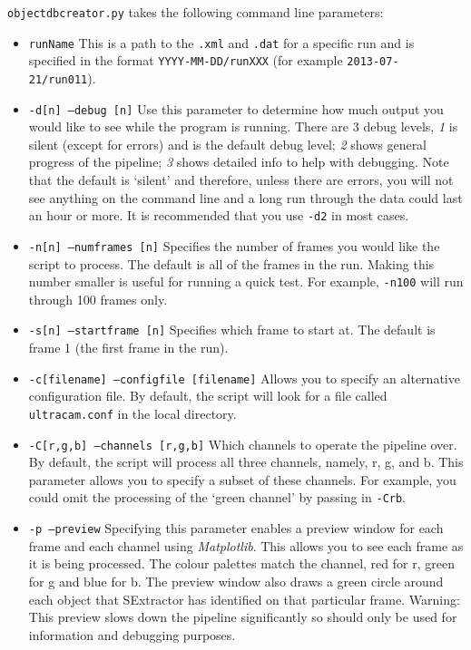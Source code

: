 \texttt{objectdbcreator.py} takes the following command line parameters:
\begin{itemize}
  \item \texttt{runName} This is a path to the \texttt{.xml} and \texttt{.dat} for a specific run and is specified in the format \texttt{YYYY-MM-DD/runXXX}  (for example \texttt{2013-07-21/run011}).
  \item \texttt{-d[n] --debug [n]} Use this parameter to determine how much output you would like to see while the program is running. There are 3 debug levels, \emph{1} is silent (except for errors) and is the default debug level; \emph{2} shows general progress of the pipeline; \emph{3} shows detailed info to help with debugging. Note that the default is `silent' and therefore, unless there are errors, you will not see anything on the command line and a long run through the data could last an hour or more. It is recommended that you use \texttt{-d2} in most cases. 
  \item \texttt{-n[n] --numframes [n]} Specifies the number of frames you would like the script to process. The default is all of the frames in the run. Making this number smaller is useful for running a quick test. For example, \texttt{-n100} will run through 100 frames only.
   \item \texttt{-s[n] --startframe [n]} Specifies which frame to start at. The default is frame 1 (the first frame in the run). 
  \item \texttt{-c[filename] --configfile [filename]} Allows you to specify an alternative configuration file. By default, the script will look for a file called \texttt{ultracam.conf} in the local directory. 
  \item \texttt{-C[r,g,b] --channels [r,g,b]} Which channels to operate the pipeline over. By default, the script will process all three channels, namely, r, g, and b. This parameter allows you to specify a subset of these channels. For example, you could omit the processing of the `green channel' by passing in \texttt{-Crb}. 
  \item \texttt{-p --preview} Specifying this parameter enables a preview window for each frame and each channel using \emph{Matplotlib}. This allows you to see each frame as it is being processed. The colour palettes match the channel, red for r, green for g and blue for b. The preview window also draws a green circle around each object that SExtractor has identified on that particular frame. Warning: This preview slows down the pipeline significantly so should only be used for information and debugging purposes. 

\end{itemize}

